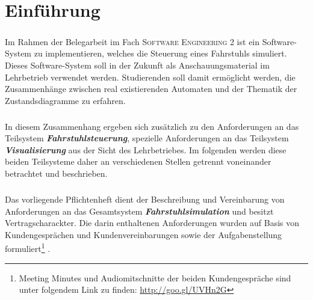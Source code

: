 \chapter{Einführung}
\paragraph{}
Im Rahmen der Belegarbeit im Fach \textsc{Software Engineering 2} ist ein Software-System zu implementieren, welches die Steuerung eines Fahrstuhls simuliert. Dieses Software-System soll in der Zukunft als Anschauungsmaterial im Lehrbetrieb verwendet werden. Studierenden soll damit ermöglicht werden, die Zusammenhänge zwischen real existierenden Automaten und der Thematik der Zustandsdiagramme zu erfahren.

\paragraph{}
In diesem Zusammenhang ergeben sich zusätzlich zu den Anforderungen an das Teilsystem \textit{\textbf{\gls{Fahrstuhlsteuerung}}}, spezielle Anforderungen an das Teilsystem \textit{\textbf{\gls{Visualisierung}}} aus der Sicht des Lehrbetriebes. Im folgenden werden diese beiden Teilsysteme daher an verschiedenen Stellen getrennt voneinander betrachtet und beschrieben.

\paragraph{}
Das vorliegende Pflichtenheft dient der Beschreibung und Vereinbarung von Anforderungen an das Gesamtsystem \textit{\textbf{\gls{Fahrstuhlsimulation}}} und besitzt Vertragscharackter. Die darin enthaltenen Anforderungen wurden auf Basis von Kundengesprächen und Kundenvereinbarungen sowie der Aufgabenstellung formuliert\footnote{Meeting Minutes und Audiomitschnitte der beiden Kundengespräche sind unter folgendem Link zu finden: \url{http://goo.gl/UVHn2G}} . 

